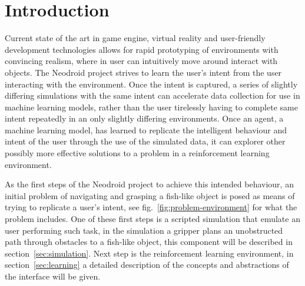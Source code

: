 \section{Introduction}




Current state of the art in game engine, virtual reality and user-friendly development technologies allows for rapid prototyping of environments with convincing realism, where in user can intuitively move around interact with objects. The Neodroid project strives to learn the user's intent from the user interacting with the environment. Once the intent is captured, a series of slightly differing simulations with the same intent can accelerate data collection for use in machine learning models, rather than the user tirelessly having to complete same intent repeatedly in an only slightly differing environments. 
Once an agent, a machine learning model, has learned to replicate the intelligent behaviour and intent of the user through the use of the simulated data, it can explorer other possibly more effective solutions to a problem in a reinforcement learning environment.

As the first steps of the Neodroid project to achieve this intended behaviour, an initial problem of navigating and grasping a fish-like object is posed as means of trying to replicate a user's intent, see fig.~\ref{fig:problem-environment} for what the problem includes. One of these first steps is a scripted simulation that emulate an user performing such task, in the simulation a gripper plans an unobstructed path through obstacles to a fish-like object, this component will be described in section~\ref{sec:simulation}. Next step is the reinforcement learning environment, in section~\ref{sec:learning} a detailed description of the concepts and abstractions of the interface will be given.

